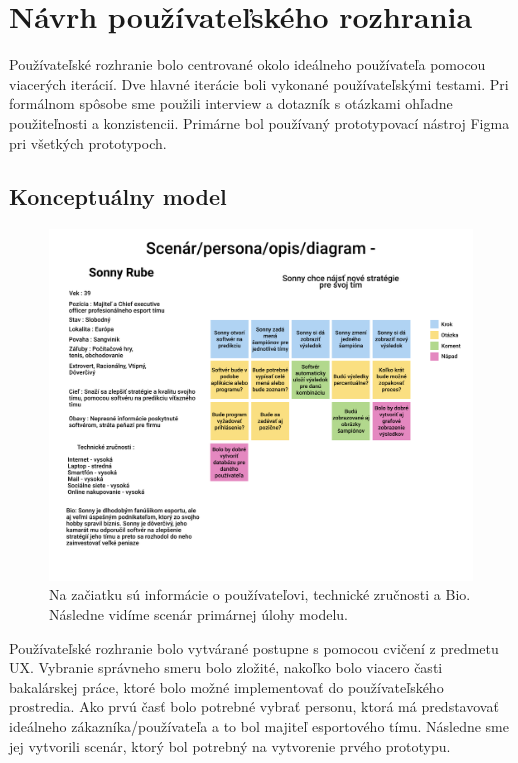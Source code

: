 \chapter{Návrh používateľského rozhrania}

\label{summary}

Používateľské rozhranie bolo centrované okolo ideálneho používateľa pomocou viacerých iterácií. Dve hlavné iterácie boli vykonané používateľskými testami. Pri formálnom spôsobe sme použili interview a dotazník s otázkami ohľadne použiteľnosti a konzistencii. Primárne bol používaný prototypovací nástroj Figma pri všetkých prototypoch.



\section*{Konceptuálny model}



\begin{figure}[h!]
	
	\includegraphics[width=.9\textwidth]{figures/scenar}
	
	\centering
	
	\caption{ Na začiatku sú informácie o používateľovi, technické zručnosti a Bio. Následne vidíme scenár primárnej úlohy modelu. \label{scenar}}
	
\end{figure}



Používateľské rozhranie bolo vytvárané postupne s pomocou cvičení z predmetu UX. Vybranie správneho smeru bolo zložité, nakoľko bolo viacero časti bakalárskej práce, ktoré bolo možné implementovať do používateľského prostredia. Ako prvú časť bolo potrebné vybrať personu, ktorá má predstavovať ideálneho zákazníka/používateľa a to bol majiteľ esportového tímu. Následne sme jej vytvorili scenár, ktorý bol potrebný na vytvorenie prvého prototypu. 



